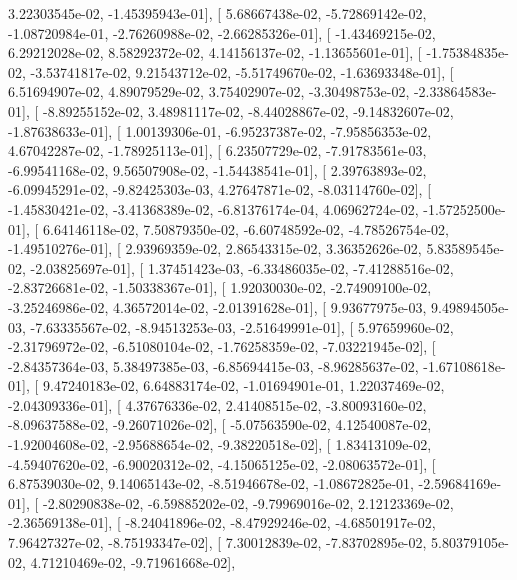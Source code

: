 \documentclass{article}
\begin{document}
          3.22303545e-02,  -1.45395943e-01],
       [  5.68667438e-02,  -5.72869142e-02,  -1.08720984e-01,
         -2.76260988e-02,  -2.66285326e-01],
       [ -1.43469215e-02,   6.29212028e-02,   8.58292372e-02,
          4.14156137e-02,  -1.13655601e-01],
       [ -1.75384835e-02,  -3.53741817e-02,   9.21543712e-02,
         -5.51749670e-02,  -1.63693348e-01],
       [  6.51694907e-02,   4.89079529e-02,   3.75402907e-02,
         -3.30498753e-02,  -2.33864583e-01],
       [ -8.89255152e-02,   3.48981117e-02,  -8.44028867e-02,
         -9.14832607e-02,  -1.87638633e-01],
       [  1.00139306e-01,  -6.95237387e-02,  -7.95856353e-02,
          4.67042287e-02,  -1.78925113e-01],
       [  6.23507729e-02,  -7.91783561e-03,  -6.99541168e-02,
          9.56507908e-02,  -1.54438541e-01],
       [  2.39763893e-02,  -6.09945291e-02,  -9.82425303e-03,
          4.27647871e-02,  -8.03114760e-02],
       [ -1.45830421e-02,  -3.41368389e-02,  -6.81376174e-04,
          4.06962724e-02,  -1.57252500e-01],
       [  6.64146118e-02,   7.50879350e-02,  -6.60748592e-02,
         -4.78526754e-02,  -1.49510276e-01],
       [  2.93969359e-02,   2.86543315e-02,   3.36352626e-02,
          5.83589545e-02,  -2.03825697e-01],
       [  1.37451423e-03,  -6.33486035e-02,  -7.41288516e-02,
         -2.83726681e-02,  -1.50338367e-01],
       [  1.92030030e-02,  -2.74909100e-02,  -3.25246986e-02,
          4.36572014e-02,  -2.01391628e-01],
       [  9.93677975e-03,   9.49894505e-03,  -7.63335567e-02,
         -8.94513253e-03,  -2.51649991e-01],
       [  5.97659960e-02,  -2.31796972e-02,  -6.51080104e-02,
         -1.76258359e-02,  -7.03221945e-02],
       [ -2.84357364e-03,   5.38497385e-03,  -6.85694415e-03,
         -8.96285637e-02,  -1.67108618e-01],
       [  9.47240183e-02,   6.64883174e-02,  -1.01694901e-01,
          1.22037469e-02,  -2.04309336e-01],
       [  4.37676336e-02,   2.41408515e-02,  -3.80093160e-02,
         -8.09637588e-02,  -9.26071026e-02],
       [ -5.07563590e-02,   4.12540087e-02,  -1.92004608e-02,
         -2.95688654e-02,  -9.38220518e-02],
       [  1.83413109e-02,  -4.59407620e-02,  -6.90020312e-02,
         -4.15065125e-02,  -2.08063572e-01],
       [  6.87539030e-02,   9.14065143e-02,  -8.51946678e-02,
         -1.08672825e-01,  -2.59684169e-01],
       [ -2.80290838e-02,  -6.59885202e-02,  -9.79969016e-02,
          2.12123369e-02,  -2.36569138e-01],
       [ -8.24041896e-02,  -8.47929246e-02,  -4.68501917e-02,
          7.96427327e-02,  -8.75193347e-02],
       [  7.30012839e-02,  -7.83702895e-02,   5.80379105e-02,
          4.71210469e-02,  -9.71961668e-02],
\end{document}
